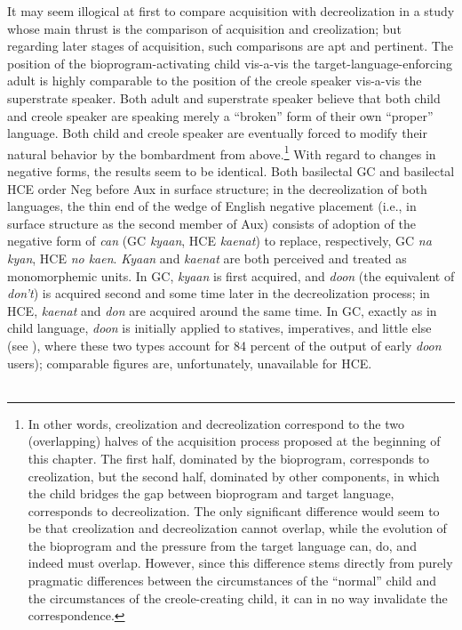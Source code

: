 It may seem illogical at first to compare acquisition with de\-creolization in a study whose main thrust is the comparison of acquisi\-tion and creolization; but regarding later stages of acquisition, such comparisons are apt and pertinent. The position of the bioprogram-activating child vis-a-vis the target-language-enforcing adult is highly comparable to the position of the creole speaker vis-a-vis the superstrate speaker. Both adult and superstrate speaker believe that both child and creole speaker are speaking merely a ``broken'' form of their own ``proper'' language. Both child and creole speaker are eventually forced to modify their natural behavior by the bombardment from above.\footnote{In other words, creolization and decreolization correspond to the two (overlapping) halves of the acquisition process proposed at the beginning of this chapter. The first half, dominated by the bioprogram, corresponds to creolization, but the second half, dominated by other components, in which the child bridges the gap between bioprogram and target language, corresponds to decreolization. The only significant difference would seem to be that creolization and decreolization cannot overlap, while the evolution of the bioprogram and the pressure from the target language can, do, and indeed must overlap. However, since this difference stems directly from purely pragmatic differences between the circumstances of the ``normal'' child and the circumstances of the creole-creating child, it can in no way invalidate the correspondence.} With regard to changes in negative forms, the results seem to be identical. Both basilectal GC and basilectal HCE order Neg
before Aux in surface structure; in the decreolization of both languages, the thin end of the wedge of English negative placement (i.e., in surface structure as the second member of Aux) consists of adoption of the negative form of \textit{can} (GC \textit{kyaan}, HCE \textit{kaenat}) to replace, respectively, GC \textit{na kyan}, HCE \textit{no kaen}. \textit{Kyaan} and \textit{kaenat} are both perceived and treated as monomorphemic units. In GC, \textit{kyaan} is first acquired, and \textit{doon} (the equivalent of \textit{don't}) is acquired second and some time later in the decreolization process; in HCE, \textit{kaenat} and \textit{don} are acquired around the same time. In GC, exactly as in child language, \textit{doon} is initially applied to statives, imperatives, and little else (see \citealt[Table~3.9]{Bickerton1975}), where these two types account for 84 percent of the output of early \textit{doon} users); comparable figures are, unfortunately, unavailable for HCE.\\\\

